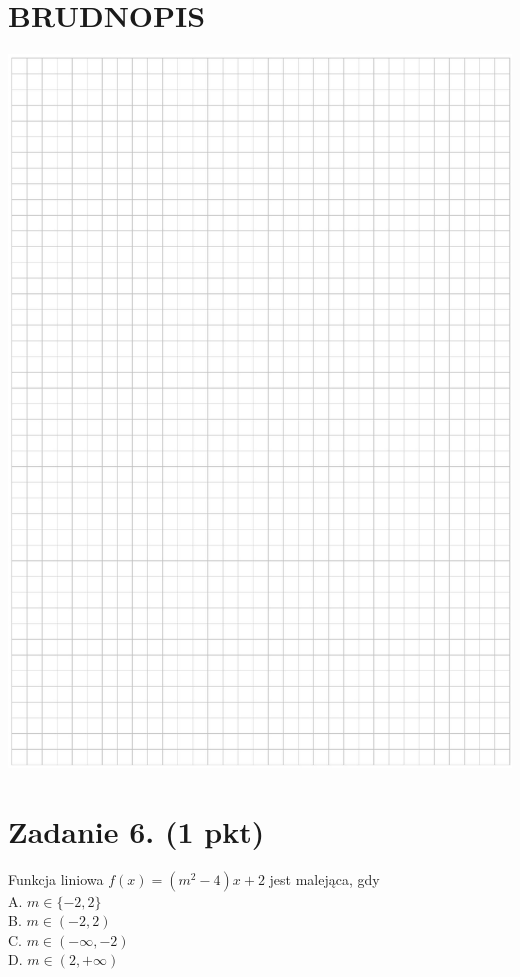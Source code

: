 \documentclass[10pt]{article}
\begin{document}
\section*{BRUDNOPIS}
\begin{center}
\includegraphics[max width=\textwidth]{2024_11_21_0c267759828927e3a26dg-03}
\end{center}

\section*{Zadanie 6. (1 pkt)}
Funkcja liniowa \(f(x)=\left(m^{2}-4\right) x+2\) jest malejąca, gdy\\
A. \(m \in\{-2,2\}\)\\
B. \(m \in(-2,2)\)\\
C. \(m \in(-\infty,-2)\)\\
D. \(m \in(2,+\infty)\)
\end{document}
